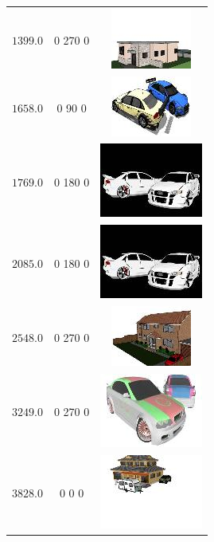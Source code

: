 \begin{longtable}{ccc}
	$1399.0$ & 0 270 0 & \includegraphics{models/272dffa3e3e4c4772a38ac2b8f5cd48.jpg}\\
	$1658.0$ & 0 90 0 & \includegraphics{models/5c224ff0c7cfa5f3a9733fa2ac6b95bc.jpg}\\
	$1769.0$ & 0 180 0 & \includegraphics{models/6686ae37bc92366e32db09455d18fca0.jpg}\\
	$2085.0$ & 0 180 0 & \includegraphics{models/671dd80a4e0a7de38660cb1e9afe8b41.jpg}\\
	$2548.0$ & 0 270 0 & \includegraphics{models/8f85bd613b7d09cd892bdf2ea4244eac.jpg}\\
	$3249.0$ & 0 270 0 & \includegraphics{models/44399fc771ff8e612c485a799081b67a.jpg}\\
	$3828.0$ & 0 0 0 & \includegraphics{models/c0ef3f633b307b55ccbfe0581df1f123.jpg}\\

\end{longtable}
